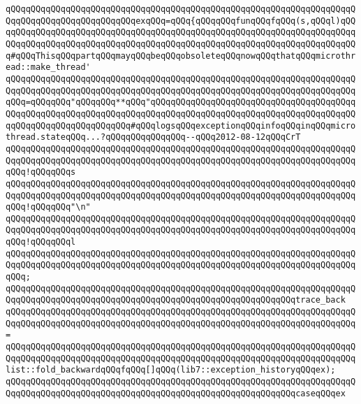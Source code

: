 \verb|qQQqqQQqqQQqqQQqqQQqqQQqqQQqqQQqqQQqqQQqqQQqqQQqqQQqqQQqqQQqqQQqqQQqqQQqqQQqqQQqqQQqqQQqqQQqqQQqexqQQq=qQQq{qQQqqQQqfunqQQqfqQQq(s,qQQql)qQQqqQQqqQQqqQQqqQQqqQQqqQQqqQQqqQQqqQQqqQQqqQQqqQQqqQQqqQQqqQQqqQQqqQQqqQQqqQQqqQQqqQQqqQQqqQQqqQQqqQQqqQQqqQQqqQQqqQQqqQQqqQQqqQQqqQQqqQQqqQQq#qQQqThisqQQqpartqQQqmayqQQqbeqQQqobsoleteqQQqnowqQQqthatqQQqmicrothread::make_thread'|\newline
\verb|qQQqqQQqqQQqqQQqqQQqqQQqqQQqqQQqqQQqqQQqqQQqqQQqqQQqqQQqqQQqqQQqqQQqqQQqqQQqqQQqqQQqqQQqqQQqqQQqqQQqqQQqqQQqqQQqqQQqqQQqqQQqqQQqqQQqqQQqqQQqqQQq=qQQqqQQq"qQQqqQQq**qQQq"qQQqqQQqqQQqqQQqqQQqqQQqqQQqqQQqqQQqqQQqqQQqqQQqqQQqqQQqqQQqqQQqqQQqqQQqqQQqqQQqqQQqqQQqqQQqqQQqqQQqqQQqqQQqqQQqqQQqqQQqqQQqqQQqqQQqqQQq#qQQqlogsqQQqexceptionqQQqinfoqQQqinqQQqmicrothread.stateqQQq...?qQQqqQQqqQQqqQQq--qQQq2012-08-12qQQqCrT|\newline
\verb|qQQqqQQqqQQqqQQqqQQqqQQqqQQqqQQqqQQqqQQqqQQqqQQqqQQqqQQqqQQqqQQqqQQqqQQqqQQqqQQqqQQqqQQqqQQqqQQqqQQqqQQqqQQqqQQqqQQqqQQqqQQqqQQqqQQqqQQqqQQqqQQq!qQQqqQQqs|\newline
\verb|qQQqqQQqqQQqqQQqqQQqqQQqqQQqqQQqqQQqqQQqqQQqqQQqqQQqqQQqqQQqqQQqqQQqqQQqqQQqqQQqqQQqqQQqqQQqqQQqqQQqqQQqqQQqqQQqqQQqqQQqqQQqqQQqqQQqqQQqqQQqqQQq!qQQqqQQq"\n"|\newline
\verb|qQQqqQQqqQQqqQQqqQQqqQQqqQQqqQQqqQQqqQQqqQQqqQQqqQQqqQQqqQQqqQQqqQQqqQQqqQQqqQQqqQQqqQQqqQQqqQQqqQQqqQQqqQQqqQQqqQQqqQQqqQQqqQQqqQQqqQQqqQQqqQQq!qQQqqQQql|\newline
\verb|qQQqqQQqqQQqqQQqqQQqqQQqqQQqqQQqqQQqqQQqqQQqqQQqqQQqqQQqqQQqqQQqqQQqqQQqqQQqqQQqqQQqqQQqqQQqqQQqqQQqqQQqqQQqqQQqqQQqqQQqqQQqqQQqqQQqqQQqqQQqqQQq;|\newline
\newline
\verb|qQQqqQQqqQQqqQQqqQQqqQQqqQQqqQQqqQQqqQQqqQQqqQQqqQQqqQQqqQQqqQQqqQQqqQQqqQQqqQQqqQQqqQQqqQQqqQQqqQQqqQQqqQQqqQQqqQQqqQQqqQQqqQQqtrace_back|\newline
\verb|qQQqqQQqqQQqqQQqqQQqqQQqqQQqqQQqqQQqqQQqqQQqqQQqqQQqqQQqqQQqqQQqqQQqqQQqqQQqqQQqqQQqqQQqqQQqqQQqqQQqqQQqqQQqqQQqqQQqqQQqqQQqqQQqqQQqqQQqqQQq=|\newline
\verb|qQQqqQQqqQQqqQQqqQQqqQQqqQQqqQQqqQQqqQQqqQQqqQQqqQQqqQQqqQQqqQQqqQQqqQQqqQQqqQQqqQQqqQQqqQQqqQQqqQQqqQQqqQQqqQQqqQQqqQQqqQQqqQQqqQQqqQQqqQQqlist::fold_backwardqQQqfqQQq[]qQQq(lib7::exception_historyqQQqex);|\newline
\newline
\verb|qQQqqQQqqQQqqQQqqQQqqQQqqQQqqQQqqQQqqQQqqQQqqQQqqQQqqQQqqQQqqQQqqQQqqQQqqQQqqQQqqQQqqQQqqQQqqQQqqQQqqQQqqQQqqQQqqQQqqQQqqQQqqQQqcaseqQQqex|\newline
